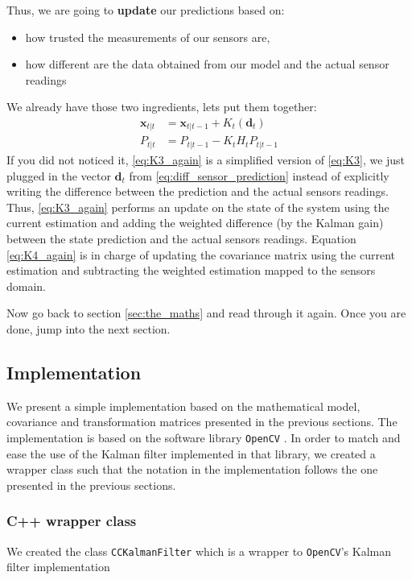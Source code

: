 \documentclass[12pt,a4paper,final]{article} %
\newcommand{\vect}[1]{\mathbf{#1}}
\begin{document}
Thus, we are going to \textbf{update} our predictions based on:
\begin{itemize}
\item how trusted the measurements of our sensors are,
\item how different are the data obtained from our model and the
  actual sensor readings
\end{itemize}
We already have those two ingredients, lets put them together:
\begin{align}
   \vect{x}_{t|t} &= \vect{x}_{t|t-1} + K_t (\vect{d}_t) \label{eq:K3_again}\\
   P_{t|t} &= P_{t|t-1} - K_t H_t P_{t|t-1} \label{eq:K4_again}
\end{align}
If you did not noticed it, \eqref{eq:K3_again} is a simplified version
of \eqref{eq:K3}, we just plugged in the vector $\vect{d}_t$ from
\eqref{eq:diff_sensor_prediction} instead of explicitly writing the
difference between the prediction and the actual sensors
readings. Thus, \eqref{eq:K3_again} performs an update on the state of
the system using the current estimation and adding the weighted
difference (by the Kalman gain) between the state prediction and the
actual sensors readings. Equation \ref{eq:K4_again} is in charge of
updating the covariance matrix using the current estimation and
subtracting the weighted estimation mapped to the sensors domain.

Now go back to section \ref{sec:the_maths} and read through it
again. Once you are done, jump into the next section.

\subsection{Implementation}
We present a simple implementation based on the mathematical model,
covariance and transformation matrices presented in the previous
sections. The implementation is based on the software library
\texttt{OpenCV} \cite{opencv:2000:AR}. In order to match and ease
the use of the Kalman filter implemented in that library, we created a
wrapper class such that the notation in the implementation follows the
one presented in the previous sections.

\subsubsection{C++ wrapper class}
We created the class \texttt{CCKalmanFilter} which is a wrapper to
\texttt{OpenCV}'s Kalman filter implementation
\end{document}
